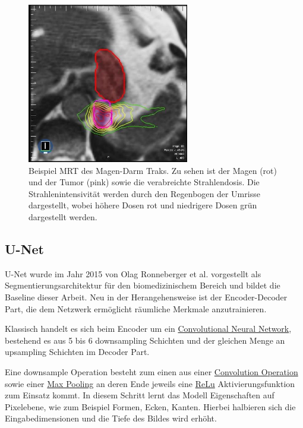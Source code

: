 \begin{figure}[H]
	\begin{center}
		\includegraphics[width=200pt]{bilder/magen-mrt}
		\caption{Beispiel MRT des Magen-Darm Traks. Zu sehen ist der Magen (rot) und der Tumor (pink) sowie die verabreichte Strahlendosis. Die Strahlenintensivität werden durch den Regenbogen der Umrisse dargestellt, wobei höhere Dosen rot und niedrigere Dosen grün dargestellt werden.}\label{magen-mrt}
	\end{center}
\end{figure}

\subsection{U-Net}

U-Net wurde im Jahr 2015 von Olag Ronneberger et al. \citet{U-Net} vorgestellt als Segmentierungsarchitektur für den biomedizinischem Bereich und bildet die Baseline dieser Arbeit. Neu in der Herangehensweise ist der Encoder-Decoder Part, die dem Netzwerk ermöglicht räumliche Merkmale anzutrainieren.

Klassisch handelt es sich beim Encoder um ein
\href{https://en.wikipedia.org/wiki/Convolutional_neural_network}{Convolutional Neural Network}, bestehend es aus 5 bis 6 downsampling Schichten und der gleichen Menge an  upsampling Schichten im Decoder Part. 

Eine downsample Operation besteht zum einen aus einer
\href{https://en.wikipedia.org/wiki/Convolution}{Convolution Operation}
sowie einer
\href{https://computersciencewiki.org/index.php/Max-pooling_/_Pooling}{Max Pooling}
an deren Ende jeweils eine
\href{https://deepai.org/machine-learning-glossary-and-terms/relu}{ReLu}
 Aktivierungsfunktion zum Einsatz kommt. In diesem Schritt lernt das Modell Eigenschaften auf Pixelebene, wie zum Beispiel Formen, Ecken, Kanten. Hierbei halbieren sich die Eingabedimensionen und die Tiefe des Bildes wird erhöht. 

